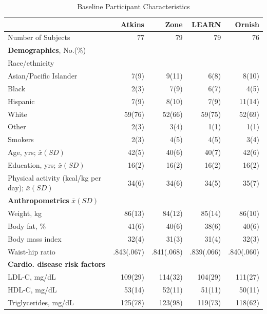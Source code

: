 \documentclass[11pt, chapterprefix=true]{scrbook}\usepackage[]{graphicx}\usepackage[]{color}
\begin{document}
\begin{table}[ht] 
\caption{Baseline Participant Characteristics}
\begin{tabular}{@{} lrrrr @{}} \hline
         & Atkins & Zone & LEARN & Ornish \\ \hline
Number of Subjects       & 77     & 79   &    79 &  76 \\
\textbf{Demographics}, No.(\%)  &  &  &  &  \\
Race/ethnicity &  &  &  &  \\
\hspace{3mm} Asian/Pacific Islander & 7(9) & 9(11) & 6(8) & 8(10) \\
\hspace{3mm} Black                  & 2(3) & 7(9)  & 6(7) & 4(5) \\
\hspace{3mm} Hispanic               & 7(9) & 8(10) & 7(9) & 11(14) \\
\hspace{3mm} White                  & 59(76) & 52(66) & 59(75) & 52(69) \\
\hspace{3mm} Other                  & 2(3)   & 3(4)   & 1(1)   & 1(1) \\
Smokers      & 2(3)   & 4(5)   & 4(5)   & 3(4) \\
Age, yrs; $\bar{x} (SD)$ & 42(5) & 40(6) & 40(7) & 42(6) \\
Education, yrs; $\bar{x} (SD)$ & 16(2) & 16(2) & 16(2) & 16(2) \\
Physical activity {\scriptsize{(kcal/kg per day)}}; $\bar{x} (SD)$     & 34(6)  & 34(6)  & 34(5)  & 35(7) \\
\textbf{Anthropometrics} $\bar{x} (SD)$   &  &  &  & \\
Weight, kg             & 86(13) & 84(12) & 85(14) & 86(10) \\
Body fat, \%           & 41(6)  & 40(6)  & 38(6)  & 40(6) \\
Body mass index        & 32(4)  & 31(3)  & 31(4)  & 32(3) \\
Waist-hip ratio        & .843(.067) & .841(.068) & .839(.066) & .840(.060) \\
\textbf{Cardio. disease risk factors} & & & & \\
LDL-C, mg/dL           & 109(29) & 114(32) & 104(29) & 111(27) \\
HDL-C, mg/dL           & 53(14)  & 52(11)  & 51(11) & 50(11) \\
Triglycerides, mg/dL   & 125(78) & 123(98) & 119(73) & 118(62) \\

\end{tabular}
\end{table}
\end{document}
